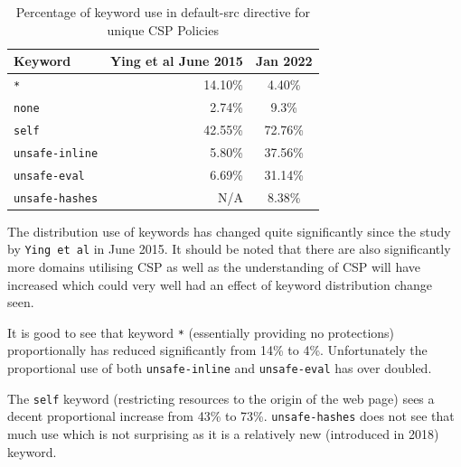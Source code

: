 \documentclass{mscreport}
\begin{document}
\begin{table}[H]
  \begin{center}
    \begin{tabular}{|l|D|c|}  %
      \hline
      \textbf{Keyword} & \textbf{Ying et al} \cite{Ying2016-ag} June 2015 & Jan 2022 \\
      \hline
      \texttt{*} & 14.10\% & 4.40\%\\
      \hline
      \texttt{none} & 2.74\% & 9.3\%\\
      \hline
      \texttt{self} & 42.55\% & 72.76\%\\
      \hline
      \texttt{unsafe-inline} & 5.80\% & 37.56\%\\
      \hline
      \texttt{unsafe-eval} & 6.69\% & 31.14\%\\
      \hline
      \texttt{unsafe-hashes} & N/A & 8.38\%\\
      \hline
    \end{tabular}
    \caption{Percentage of keyword use in default-src directive for unique CSP Policies}
    \label{table:csp_default-src-keyword} %
  \end{center}
\end{table}

\clearpage
\newpage

\noindent
The distribution use of keywords has changed quite significantly since the study by \texttt{Ying et al} \cite{Ying2016-ag} in June 2015. It should be noted that there are also significantly more domains utilising CSP as well as the understanding of CSP will have increased which could very well had an effect of keyword distribution change seen.

\vspace{0.3cm} \noindent
It is good to see that keyword \texttt{*} (essentially providing no protections) proportionally has reduced significantly from 14\% to 4\%. Unfortunately the proportional use of both \texttt{unsafe-inline} and \texttt{unsafe-eval} has over doubled.

\vspace{0.3cm} \noindent
The \texttt{self} keyword (restricting resources to the origin of the web page) sees a decent proportional increase from 43\% to 73\%. \texttt{unsafe-hashes} does not see that much use which is not surprising as it is a relatively new (introduced in 2018) keyword.
\end{document}
